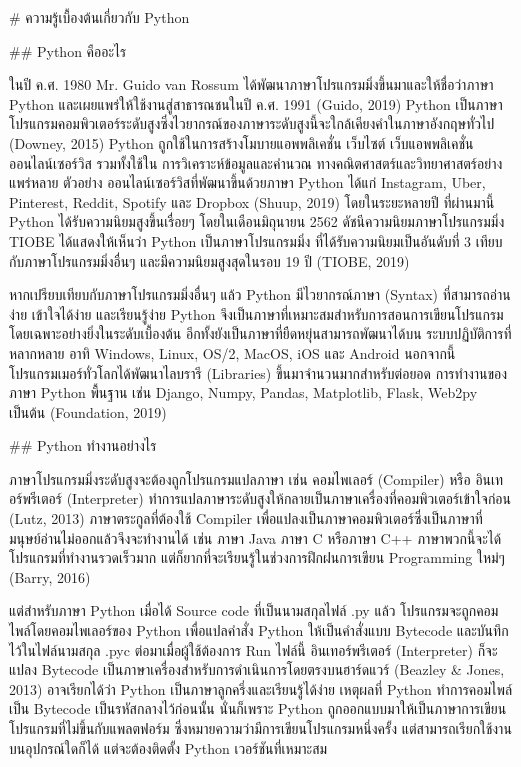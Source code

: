 \begin{markdown}

# ความรู้เบื้องต้นเกี่ยวกับ Python

## Python คืออะไร

ในปี ค.ศ. 1980 Mr. Guido van Rossum ได้พัฒนาภาษาโปรแกรมมิ่งขึ้นมาและให้ชื่อว่าภาษา Python และเผยแพร่ให้ใช้งานสู่สาธารณชนในปี ค.ศ. 1991 (Guido, 2019) Python เป็นภาษาโปรแกรมคอมพิวเตอร์ระดับสูงซึ่งไวยากรณ์ของภาษาระดับสูงนี้จะใกล้เคียงคำในภาษาอังกฤษทั่วไป (Downey, 2015) Python ถูกใช้ในการสร้างโมบายแอพพลิเคชั่น เว็บไซต์ เว็บแอพพลิเคชั่น ออนไลน์เซอร์วิส รวมทั้งใช้ใน การวิเคราะห์ข้อมูลและคำนวณ ทางคณิตศาสตร์และวิทยาศาสตร์อย่างแพร่หลาย  ตัวอย่าง ออนไลน์เซอร์วิสที่พัฒนาขึ้นด้วยภาษา Python ได้แก่ Instagram, Uber, Pinterest, Reddit, Spotify และ Dropbox (Shuup, 2019) โดยในระยะหลายปี ที่ผ่านมานี้ Python ได้รับความนิยมสูงขึ้นเรื่อยๆ โดยในเดือนมิถุนายน 2562 ดัชนีความนิยมภาษาโปรแกรมมิ่ง TIOBE ได้แสดงให้เห็นว่า Python เป็นภาษาโปรแกรมมิ่ง ที่ได้รับความนิยมเป็นอันดับที่ 3 เทียบกับภาษาโปรแกรมมิ่งอื่นๆ และมีความนิยมสูงสุดในรอบ 19 ปี (TIOBE, 2019)

หากเปรียบเทียบกับภาษาโปรแกรมมิ่งอื่นๆ แล้ว Python มีไวยากรณ์ภาษา (Syntax) ที่สามารถอ่านง่าย เข้าใจได้ง่าย และเรียนรู้ง่าย Python จึงเป็นภาษาที่เหมาะสมสำหรับการสอนการเขียนโปรแกรมโดยเฉพาะอย่างยิ่งในระดับเบื้องต้น อีกทั้งยังเป็นภาษาที่ยืดหยุ่นสามารถพัฒนาได้บน ระบบปฏิบัติการที่หลากหลาย อาทิ  Windows, Linux, OS/2, MacOS, iOS และ Android นอกจากนี้ โปรแกรมเมอร์ทั่วโลกได้พัฒนาไลบรารี (Libraries) ขึ้นมาจำนวนมากสำหรับต่อยอด การทำงานของภาษา Python พื้นฐาน เช่น Django, Numpy, Pandas, Matplotlib, Flask, Web2py เป็นต้น (Foundation, 2019)

## Python ทำงานอย่างไร

ภาษาโปรแกรมมิ่งระดับสูงจะต้องถูกโปรแกรมแปลภาษา เช่น คอมไพเลอร์ (Compiler) หรือ อินเทอร์พรีเตอร์ (Interpreter) ทำการแปลภาษาระดับสูงให้กลายเป็นภาษาเครื่องที่คอมพิวเตอร์เข้าใจก่อน (Lutz, 2013) ภาษาตระกูลที่ต้องใช้ Compiler เพื่อแปลงเป็นภาษาคอมพิวเตอร์ซึ่งเป็นภาษาที่มนุษย์อ่านไม่ออกแล้วจึงจะทำงานได้ เช่น ภาษา Java ภาษา C หรือภาษา C++ ภาษาพวกนี้จะได้โปรแกรมที่ทำงานรวดเร็วมาก แต่ก็ยากที่จะเรียนรู้ในช่วงการฝึกฝนการเขียน Programming ใหม่ๆ (Barry, 2016)

แต่สำหรับภาษา Python เมื่อได้ Source code ที่เป็นนามสกุลไฟล์ .py แล้ว โปรแกรมจะถูกคอมไพล์โดยคอมไพเลอร์ของ Python เพื่อแปลคำสั่ง Python ให้เป็นคำสั่งแบบ Bytecode และบันทึกไว้ในไฟล์นามสกุล .pyc ต่อมาเมื่อผู้ใช้ต้องการ Run ไฟล์นี้ อินเทอร์พรีเตอร์ (Interpreter) ก็จะแปลง Bytecode เป็นภาษาเครื่องสำหรับการดำเนินการโดยตรงบนฮาร์ดแวร์ (Beazley & Jones, 2013) อาจเรียกได้ว่า Python เป็นภาษาลูกครึ่งและเรียนรู้ได้ง่าย เหตุผลที่ Python ทำการคอมไพล์เป็น Bytecode เป็นรหัสกลางไว้ก่อนนั้น นั่นก็เพราะ Python ถูกออกแบบมาให้เป็นภาษาการเขียนโปรแกรมที่ไม่ขึ้นกับแพลตฟอร์ม ซึ่งหมายความว่ามีการเขียนโปรแกรมหนึ่งครั้ง แต่สามารถเรียกใช้งานบนอุปกรณ์ใดก็ได้ แต่จะต้องติดตั้ง Python เวอร์ชันที่เหมาะสม 


\end{markdown}